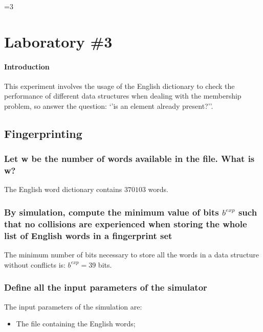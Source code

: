 \documentclass{report}
\newcounter{debug}
\begin{document}
			
			
\ifnum\value{debug}=3 {

\chapter{Laboratory \#3}
	 \subsubsection{Introduction}
				This experiment involves the usage of the English dictionary to check the performance of different data structures when dealing with the membership problem, so answer the question: `'is an element already present?''. 
	 
	 \section{Fingerprinting}	 
	 
			 	\subsection{Let w be the number of words available in the file. What is w?}
								The English word dictionary contains $370103$ words.
								
			 	\subsection{By simulation, compute the minimum value of bits $b^{exp}$ such that no collisions are experienced when storing the whole list of English words in a fingerprint set}
						The minimum number of bits necessary to store all the words in a data structure without conflicts is: $b^{exp} = 39$ bits.
						
				\subsection{Define all the input parameters of the simulator}
					The input parameters of the simulation are:
					\begin{itemize}
						\item The file containing the English words;
					\end{itemize}
					 
}
\end{document}
